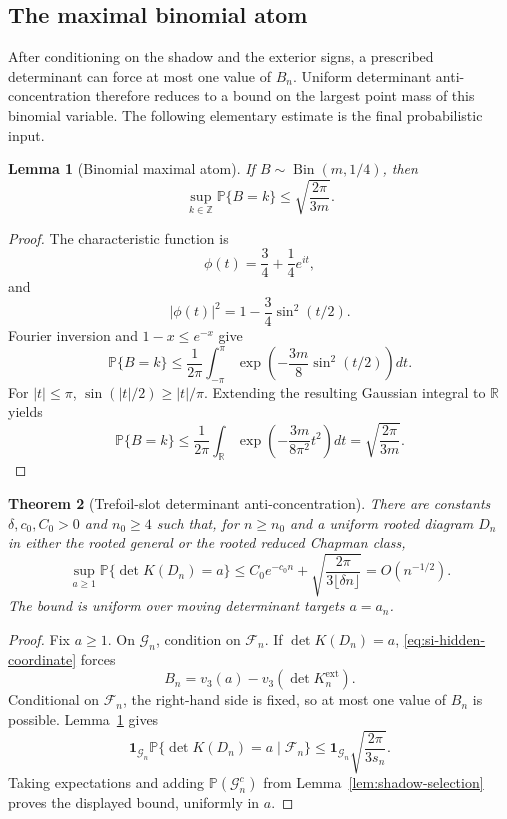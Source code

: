 \documentclass[9pt,twoside]{pnas-new}
\newtheorem{theorem}{Theorem}
\newtheorem{lemma}[theorem]{Lemma}
\theoremstyle{definition}
\theoremstyle{remark}
\renewcommand{\Pr}{\mathbb{P}}
\begin{document}
\subsection{The maximal binomial atom}
After conditioning on the shadow and the exterior signs, a prescribed determinant can force at most one value of $B_n$. Uniform determinant anti-concentration therefore reduces to a bound on the largest point mass of this binomial variable. The following elementary estimate is the final probabilistic input.

\begin{lemma}[Binomial maximal atom]
\label{lem:binomial-atom}
If $B\sim\operatorname{Bin}(m,1/4)$, then
\[
 \sup_{k\in\mathbb Z}\Pr\{B=k\}
 \le\sqrt{\frac{2\pi}{3m}}.
\]
\end{lemma}

\begin{proof}
The characteristic function is
\[
 \phi(t)=\frac34+\frac14e^{it},
\]
and
\[
 \lvert\phi(t)\rvert^2
 =1-\frac34\sin^2(t/2).
\]
Fourier inversion and $1-x\le e^{-x}$ give
\[
 \Pr\{B=k\}
 \le\frac1{2\pi}\int_{-\pi}^{\pi}
 \exp\!\left(-\frac{3m}{8}\sin^2(t/2)\right)dt.
\]
For $\lvert t\rvert\le\pi$, $\sin(\lvert t\rvert/2)\ge\lvert t\rvert/\pi$. Extending the resulting Gaussian integral to $\mathbb R$ yields
\[
 \Pr\{B=k\}
 \le\frac1{2\pi}\int_{\mathbb R}
 \exp\!\left(-\frac{3m}{8\pi^2}t^2\right)dt
 =\sqrt{\frac{2\pi}{3m}}.
\]
\end{proof}

\begin{theorem}[Trefoil-slot determinant anti-concentration]
\label{thm:si-det-anti}
There are constants $\delta,c_0,C_0>0$ and $n_0\ge4$ such that, for $n\ge n_0$ and a uniform rooted diagram $D_n$ in either the rooted general or the rooted reduced Chapman class,
\[
 \sup_{a\ge1}\Pr\{\det K(D_n)=a\}
 \le C_0e^{-c_0n}
 +\sqrt{\frac{2\pi}{3\lfloor\delta n\rfloor}}
 =O(n^{-1/2}).
\]
The bound is uniform over moving determinant targets $a=a_n$.
\end{theorem}

\begin{proof}
Fix $a\ge1$.  On $\mathcal G_n$, condition on $\mathcal F_n$.  If $\det K(D_n)=a$, \eqref{eq:si-hidden-coordinate} forces
\[
 B_n=v_3(a)-v_3(\det K_n^{\mathrm{ext}}).
\]
Conditional on $\mathcal F_n$, the right-hand side is fixed, so at most one value of $B_n$ is possible. Lemma~\ref{lem:binomial-atom} gives
\[
 \mathbf 1_{\mathcal G_n}\Pr\{\det K(D_n)=a\mid\mathcal F_n\}
 \le
 \mathbf 1_{\mathcal G_n}\sqrt{\frac{2\pi}{3s_n}}.
\]
Taking expectations and adding $\Pr(\mathcal G_n^c)$ from Lemma~\ref{lem:shadow-selection} proves the displayed bound, uniformly in $a$.
\end{proof}
\end{document}
